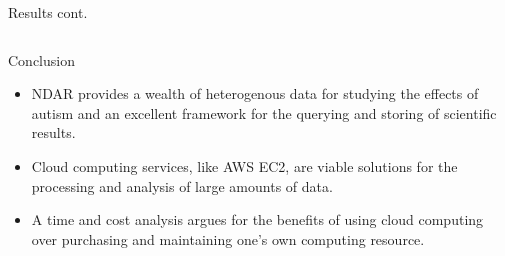 \documentclass[final,hyperref={pdfpagelabels=false}]{beamer}
\begin{document}
\begin{frame}
\begin{columns}
\begin{column}{.5\textwidth}
{\begin{block}{Results cont.}
\begin{column}{.47\textwidth}
          \end{column}
        \end{block}
        \begin{block}{Conclusion}
            \begin{itemize}
                \item NDAR provides a wealth of heterogenous data for studying the effects of autism and an excellent framework for the querying and storing of scientific results.
                \item Cloud computing services, like AWS EC2, are viable solutions for the processing and analysis of large amounts of data.
                \item A time and cost analysis argues for the benefits of using cloud computing over purchasing and maintaining one's own computing resource.
            \end{itemize}
        \end{block}
          }
    \end{column}
  \end{columns}
\end{frame}
\end{document}
